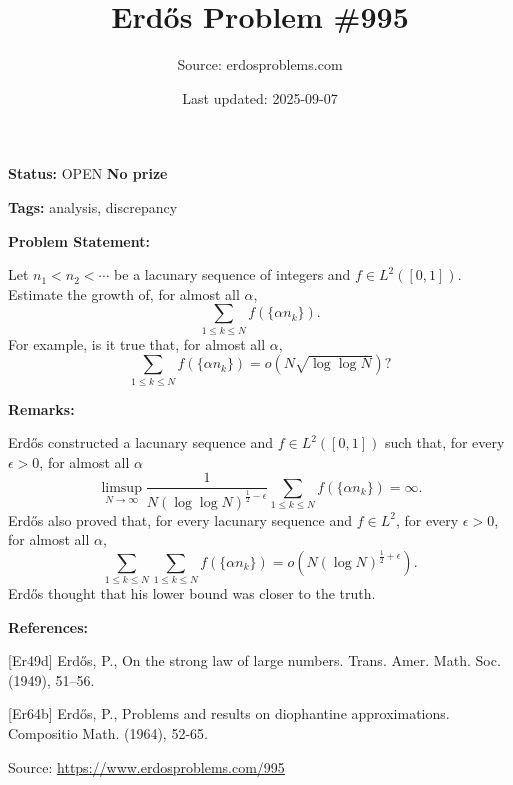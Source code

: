\documentclass{article}
\title{Erd\H{o}s Problem \#995}
\date{Last updated: 2025-09-07}
\author{Source: erdosproblems.com}
\begin{document}
\maketitle

\noindent\textbf{Status:} OPEN \quad \textbf{No prize}

\noindent\textbf{Tags:} analysis, discrepancy

\medskip
\noindent\textbf{Problem Statement:}

Let $n_1<n_2<\cdots$ be a lacunary sequence of integers and $f\in L^2([0,1])$. Estimate the growth of, for almost all $\alpha$,\[\sum_{1\leq k\leq N}f(\{ \alpha n_k\}).\]For example, is it true that, for almost all $\alpha$,\[\sum_{1\leq k\leq N}f(\{ \alpha n_k\})=o(N\sqrt{\log\log N})?\]

\bigskip
\noindent\textbf{Remarks:}

Erd\H{o}s \cite{Er49d} constructed a lacunary sequence and $f\in L^2([0,1])$ such that, for every $\epsilon>0$, for almost all $\alpha$\[\limsup_{N\to \infty}\frac{1}{N(\log\log N)^{\frac{1}{2}-\epsilon}}\sum_{1\leq k\leq N}f(\{\alpha n_k\})=\infty.\]Erd\H{o}s also proved that, for every lacunary sequence and $f\in L^2$, for every $\epsilon>0$, for almost all $\alpha$,\[\sum_{1\leq k\leq N}\sum_{1\leq k\leq N}f(\{\alpha n_k\})=o( N(\log N)^{\frac{1}{2}+\epsilon}).\]Erd\H{o}s \cite{Er64b} thought that his lower bound was closer to the truth.

\bigskip
\noindent\textbf{References:}

[Er49d] Erd\H{o}s, P., On the strong law of large numbers. Trans. Amer. Math. Soc. (1949), 51--56.
 
 [Er64b] Erd\H{o}s, P., Problems and results on diophantine approximations. Compositio Math. (1964), 52-65.

\bigskip
\noindent\small{Source: \url{https://www.erdosproblems.com/995}}
\end{document}
